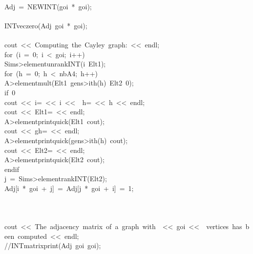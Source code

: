 \begin{tabbing}
\\[0pt]
\>Adj\ =\ NEWINT(goi\ *\ goi);\\[0pt]
\\[0pt]
\>INTveczero(Adj\ goi\ *\ goi);\\[0pt]
\\[0pt]
\>cout\ <<\ Computing\ the\ Cayley\ graph:\ <<\ endl;\\[0pt]
\>for\ (i\ =\ 0;\ i\ <\ goi;\ i++)\ \\[0pt]
\>\>Sims>elementunrankINT(i\ Elt1);\\[0pt]
\>\>for\ (h\ =\ 0;\ h\ <\ nbA4;\ h++)\ \\[0pt]
\>\>\>A>elementmult(Elt1\ gens>ith(h)\ Elt2\ 0);\\[0pt]
if\ 0\\[0pt]
\>\>\>cout\ <<\ i=\ <<\ i\ <<\ \ h=\ <<\ h\ <<\ endl;\\[0pt]
\>\>\>cout\ <<\ Elt1=\ <<\ endl;\\[0pt]
\>\>\>A>elementprintquick(Elt1\ cout);\\[0pt]
\>\>\>cout\ <<\ gh=\ <<\ endl;\\[0pt]
\>\>\>A>elementprintquick(gens>ith(h)\ cout);\\[0pt]
\>\>\>cout\ <<\ Elt2=\ <<\ endl;\\[0pt]
\>\>\>A>elementprintquick(Elt2\ cout);\\[0pt]
endif\\[0pt]
\>\>\>j\ =\ Sims>elementrankINT(Elt2);\\[0pt]
\>\>\>Adj[i\ *\ goi\ +\ j]\ =\ Adj[j\ *\ goi\ +\ i]\ =\ 1;\\[0pt]
\>\>\>\\[0pt]
\>\>\\[0pt]
\\[0pt]
\>cout\ <<\ The\ adjacency\ matrix\ of\ a\ graph\ with\ \ <<\ goi\ <<\ \ vertices\ has\ been\ computed\ <<\ endl;\\[0pt]
\>//INTmatrixprint(Adj\ goi\ goi);\\[0pt]

\end{tabbing}
